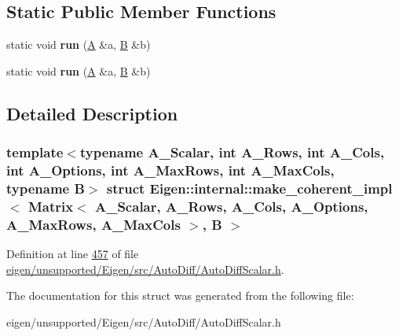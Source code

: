 \subsection*{Static Public Member Functions}
\begin{DoxyCompactItemize}
\item 
\mbox{\label{struct_eigen_1_1internal_1_1make__coherent__impl_3_01_matrix_3_01_a___scalar_00_01_a___rows_00_0aa8f55819fa60ac5751cc2cbbaa58000_ab87460e4383bd06e3100fb51d9577b1a}} 
static void {\bfseries run} (\hyperlink{group___core___module_class_eigen_1_1_matrix}{A} \&a, \hyperlink{group___core___module_class_eigen_1_1_matrix}{B} \&b)
\item 
\mbox{\label{struct_eigen_1_1internal_1_1make__coherent__impl_3_01_matrix_3_01_a___scalar_00_01_a___rows_00_0aa8f55819fa60ac5751cc2cbbaa58000_ab87460e4383bd06e3100fb51d9577b1a}} 
static void {\bfseries run} (\hyperlink{group___core___module_class_eigen_1_1_matrix}{A} \&a, \hyperlink{group___core___module_class_eigen_1_1_matrix}{B} \&b)
\end{DoxyCompactItemize}


\subsection{Detailed Description}
\subsubsection*{template$<$typename A\+\_\+\+Scalar, int A\+\_\+\+Rows, int A\+\_\+\+Cols, int A\+\_\+\+Options, int A\+\_\+\+Max\+Rows, int A\+\_\+\+Max\+Cols, typename B$>$\newline
struct Eigen\+::internal\+::make\+\_\+coherent\+\_\+impl$<$ Matrix$<$ A\+\_\+\+Scalar, A\+\_\+\+Rows, A\+\_\+\+Cols, A\+\_\+\+Options, A\+\_\+\+Max\+Rows, A\+\_\+\+Max\+Cols $>$, B $>$}



Definition at line \hyperlink{eigen_2unsupported_2_eigen_2src_2_auto_diff_2_auto_diff_scalar_8h_source_l00457}{457} of file \hyperlink{eigen_2unsupported_2_eigen_2src_2_auto_diff_2_auto_diff_scalar_8h_source}{eigen/unsupported/\+Eigen/src/\+Auto\+Diff/\+Auto\+Diff\+Scalar.\+h}.



The documentation for this struct was generated from the following file\+:\begin{DoxyCompactItemize}
\item 
eigen/unsupported/\+Eigen/src/\+Auto\+Diff/\+Auto\+Diff\+Scalar.\+h\end{DoxyCompactItemize}
